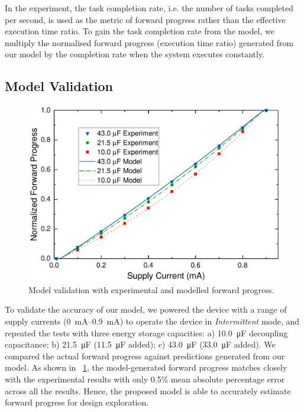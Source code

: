 In the experiment, the task completion rate, i.e. the number of tasks completed per second, is used as the metric of forward progress rather than the effective execution time ratio. 
To gain the task completion rate from the model, we multiply the normalised forward progress (execution time ratio) generated from our model by the completion rate when the system executes constantly. 

\subsection{Model Validation} 

\begin{figure}
	\centering
	\includegraphics[width=\columnwidth]{ch3_sizingeffect/figures/ModelValidFig}
	\caption{Model validation with experimental and modelled forward progress. }
	\label{fig:modelvalid}
\end{figure}

To validate the accuracy of our model, we powered the device with a range of supply currents (\SIrange{0}{0.9}{\milli\ampere}) to operate the device in \textit{Intermittent} mode, and repeated the tests with three energy storage capacities: a) \SI{10.0}{\micro\farad} decoupling capacitance; b) \SI{21.5}{\micro\farad} (\SI{11.5}{\micro\farad} added); c) \SI{43.0}{\micro\farad} (\SI{33.0}{\micro\farad} added).
We compared the actual forward progress against predictions generated from our model. 
As shown in \figurename{~\ref{fig:modelvalid}}, the model-generated forward progress matches closely with the experimental results with only 0.5\% mean absolute percentage error across all the results. 
Hence, the proposed model is able to accurately estimate forward progress for design exploration. 

